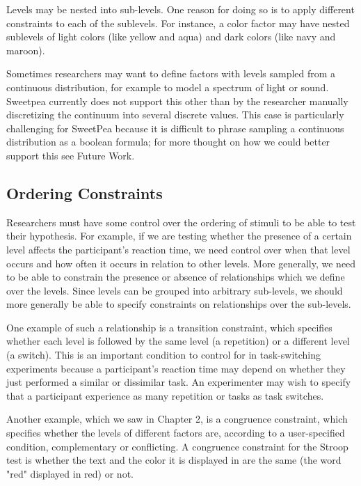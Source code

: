 Levels may be nested into sub-levels. One reason for doing so is to apply different constraints to each of the sublevels. For instance, a color factor may have nested sublevels of light colors (like yellow and aqua) and dark colors (like navy and maroon).

Sometimes researchers may want to define factors with levels sampled from a continuous distribution, for example to model a spectrum of light or sound. Sweetpea currently does not support this other than by the researcher manually discretizing the continuum into several discrete values. This case is particularly challenging for SweetPea because it is difficult to phrase sampling a continuous distribution as a boolean formula; for more thought on how we could better support this see Future Work.

\subsection{Ordering Constraints}

Researchers must have some control over the ordering of stimuli to be able to test their hypothesis. For example, if we are testing whether the presence of a certain level affects the participant's reaction time, we need control over when that level occurs and how often it occurs in relation to other levels. More generally, we need to be able to constrain the presence or absence of relationships which we define over the levels. Since levels can be grouped into arbitrary sub-levels, we should more generally be able to specify constraints on relationships over the sub-levels.

One example of such a relationship is a transition constraint, which specifies whether each level is followed by the same level (a repetition) or a different level (a switch). This is an important condition to control for in task-switching experiments because a participant's reaction time may depend on whether they just performed a similar or dissimilar task. An experimenter may wish to specify that a participant experience as many repetition or tasks as task switches.

Another example, which we saw in Chapter 2, is a congruence constraint, which specifies whether the levels of different factors are, according to a user-specified condition, complementary or conflicting. A congruence constraint for the Stroop test is whether the text and the color it is displayed in are the same (the word "red" displayed in red) or not.

